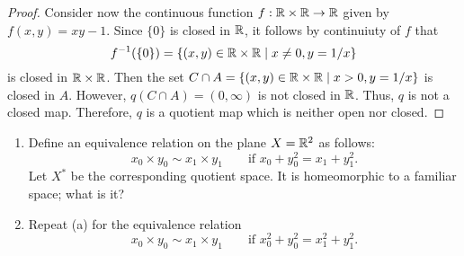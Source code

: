 \begin{solution}
\begin{proof}
    Consider now the continuous function $f: \mathbb{R} \times \mathbb{R} \rightarrow \mathbb{R}$ given by $f(x, y) = x y - 1$.
    Since $\{0\}$ is closed in $\mathbb{R}$, it follows by continuiuty of $f$ that
    \begin{equation*}
      f^{-1}(\{0\}) = \{(x, y) \in \mathbb{R} \times \mathbb{R} \mid x \neq 0, y = 1 / x \}
    \end{equation*}
    is closed in $\mathbb{R} \times \mathbb{R}$.
    Then the set $C \cap A = \{(x, y) \in \mathbb{R} \times \mathbb{R} \mid x > 0, y = 1 / x \}$ is closed in $A$.
    However, $q(C \cap A) = (0, \infty)$ is not closed in $\mathbb{R}$.
    Thus, $q$ is not a closed map.
    Therefore, $q$ is a quotient map which is neither open nor closed.
  \end{proof}
\end{solution}
\newpage


\begin{exercise}[ID=2.22.4]
  \begin{enumerate}[label={(\alph*)}, align=left, leftmargin=\parindent, listparindent=\parindent, labelwidth=0pt, itemindent=!]
    \item
      Define an equivalence relation on the plane $X = \mathbb{R}^2$ as follows:
      \begin{equation*}
        x_0 \times y_0 \sim x_1 \times y_1 \qquad \text{if } x_0 + y_0^2 = x_1 + y_1^2.
      \end{equation*}
      Let $X^*$ be the corresponding quotient space.
      It is homeomorphic to a familiar space; what is it?
    \item
      Repeat (a) for the equivalence relation
      \begin{equation*}
        x_0 \times y_0 \sim x_1 \times y_1 \qquad \text{if } x_0^2 + y_0^2 = x_1^2 + y_1^2.
      \end{equation*}
  \end{enumerate}
\end{exercise}
%
